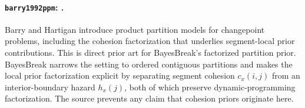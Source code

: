 
\paragraph{\texttt{barry1992ppm}: \citet{barry1992ppm}.}
Barry and Hartigan introduce product partition models for changepoint problems, including the cohesion factorization that underlies segment-local prior contributions. This is direct prior art for BayesBreak's factorized partition prior. BayesBreak narrows the setting to ordered contiguous partitions and makes the local prior factorization explicit by separating segment cohesion $c_x(i,j)$ from an interior-boundary hazard $h_x(j)$, both of which preserve dynamic-programming factorization. The source prevents any claim that cohesion priors originate here.

